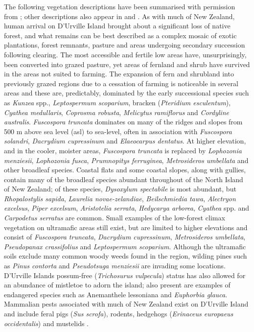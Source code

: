 \documentclass{article}
\begin{document}
The following vegetation descriptions have been summarised with permission from \cite{walls,wallsb};  other descriptions also appear in \cite{lee1992new} and \cite{beever1989new}. As with much of New Zealand, human arrival on D'Urville Island brought about a significant loss of native forest, and what remains can be best described as a complex mosaic of exotic plantations, forest remnants, pasture and areas undergoing secondary succession following clearing.  The most accessible and fertile low areas have, unsurprisingly, been converted into grazed pasture, yet areas of fernland and shrub have survived in the areas not suited to farming.  The expansion of fern and shrubland into previously grazed regions due to a cessation of farming is noticeable in several areas and these are, predictably, dominated by the early successional species such as \textit{Kunzea} spp., \textit{Leptospermum scoparium}, bracken (\textit{Pteridium esculentum}), \textit{Cyathea medullaris}, \textit{Coprosma robusta},  \textit{Melicytus ramiflorus} and  \textit{Cordyline australis}.   \textit{Fuscospora truncata} dominates on many of the ridges and slopes from 500 m above sea level (asl) to sea-level, often in association with \textit{Fuscospora solandri}, \textit{Dacrydium cupressinum} and \textit{Elaeocarpus dentatus}.  At higher elevation, and in the cooler, moister areas, \textit{Fuscospora truncata} is replaced by \textit{Lophozonia menziesii}, \textit{Lophozonia fusca}, \textit{Prumnopitys ferruginea}, \textit{Metrosideros umbellata} and other broadleaf species.  Coastal flats and some coastal slopes, along with gullies, contain many of the broadleaf species abundant throughout of the North Island of New Zealand; of these species, \textit{Dysoxylum spectabile} is most abundant, but  \textit{Rhopalostylis sapida}, \textit{Laurelia novae-zelandiae},   \textit{Beilschmiedia tawa},  \textit{Alectryon excelsus}, \textit{Piper excelsum}, \textit{Aristotelia serrata},  \textit{Hedycarya arborea}, \textit{Cyathea} spp. and \textit{Carpodetus serratus} are common.  Small examples of the low-forest climax vegetation on ultramafic areas still exist, but are limited to higher elevations and consist of \textit{Fuscospora truncata}, \textit{Dacrydium cupressinum}, \textit{Metrosideros umbellata}, \textit{Pseudopanax crassifolius} and \textit{Leptospermum scoparium}.  Although the ultramafic soils exclude many common woody weeds found in the region, wilding pines such as \textit{Pinus contorta} and \textit{Pseudotsuga menziesii} are invading some locations.  D'Urville Islands possum-free  (\textit{Trichosurus vulpecula}) status has also allowed for an abundance of mistletoe to adorn the island; also present are examples of endangered species such as {Anemanthele lessoniana} and \textit{Euphorbia glauca}.  Mammalian pests associated with much of New Zealand exist on D'Urville Island and include feral pigs (\textit{Sus scrofa}), rodents, hedgehogs (\textit{Erinaceus europaeus occidentalis}) and mustelids \citep{walls}.
\end{document}
